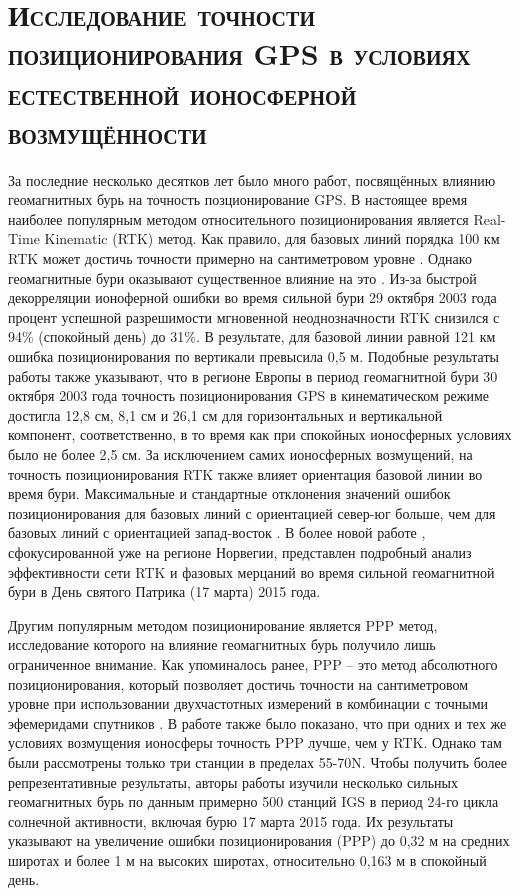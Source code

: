 \chapter{\textsc{Исследование точности позиционирования GPS в условиях естественной ионосферной возмущённости}}

За последние несколько десятков лет было много работ, посвящённых влиянию геомагнитных бурь на точность позционирование GPS.
В настоящее время наиболее популярным методом относительного позиционирования является Real-Time Kinematic (RTK) метод.
Как правило, для базовых линий порядка 100 км RTK может достичь точности примерно на сантиметровом уровне \cite{Rizos2002}.
Однако геомагнитные бури оказывают существенное влияние на это \cite{Jacobsen2012}. 
Из-за быстрой декорреляции ионоферной ошибки во время сильной бури 29 октября 2003 года процент успешной разрешимости мгновенной неоднозначности RTK снизился с 94\% (спокойный день) до 31\%.  
В результате, для базовой линии равной 121 км ошибка позиционирования по вертикали превысила 0,5 м.
Подобные результаты работы \cite{Bergeot2011} также указывают, что в регионе Европы в период геомагнитной бури 30 октября 2003 года точность позиционирования GPS в кинематическом режиме достигла 12,8 см, 8,1 см и 26,1 см для горизонтальных и вертикальной компонент, соответственно, в то время как при спокойных ионосферных условиях было не более 2,5 см.
За исключением самих ионосферных возмущений, на точность позиционирования RTK также влияет ориентация базовой линии во время бури.
Максимальные и стандартные отклонения значений ошибок позиционирования для базовых линий с ориентацией север-юг больше, чем для базовых линий с ориентацией запад-восток \cite{Lejeune2012}. 
В более новой работе \cite{Jacobsen2016}, сфокусированной уже на регионе Норвегии, представлен подробный анализ эффективности сети RTK и фазовых мерцаний во время сильной геомагнитной бури в День святого Патрика (17 марта) 2015 года.   

Другим популярным методом позиционирование является PPP метод, исследование которого на влияние геомагнитных бурь получило лишь ограниченное внимание. 
Как упоминалось ранее, PPP --  это метод абсолютного позиционирования, который позволяет достичь точности на сантиметровом уровне при использовании двухчастотных измерений в комбинации с точными эфемеридами спутников \cite{Zumberge1997,Lou2016}. 
В работе \cite{Jacobsen2016} также было показано, что при одних и тех же условиях возмущения ионосферы точность PPP лучше, чем у RTK.
Однако там были рассмотрены только три станции в пределах 55-70\degree N.
Чтобы получить более репрезентативные результаты, авторы работы \cite{Luo2018} изучили несколько сильных геомагнитных бурь по данным примерно 500 станций IGS в период 24-го цикла солнечной активности, включая бурю 17 марта 2015 года.     
Их результаты указывают на увеличение ошибки позиционирования (PPP) до 0,32 м на средних широтах и более 1 м на высоких широтах, относительно 0,163 м в спокойный день.

